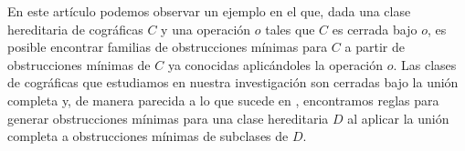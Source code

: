 En este artículo podemos observar un ejemplo en el que, dada
una clase hereditaria de cográficas $C$ y una operación
$o$ tales que $C$ es cerrada bajo $o$, es posible encontrar
familias de obstrucciones mínimas para $C$ a partir de
obstrucciones mínimas de $C$ ya conocidas aplic\'andoles
la operación $o$. Las clases de cográficas que estudiamos en
nuestra investigación son cerradas bajo la unión completa y,
de manera parecida a lo que sucede en \cite{Hell03},
encontramos reglas para generar obstrucciones mínimas para
una clase hereditaria $D$ al aplicar la unión completa a
obstrucciones mínimas de subclases de $D$.

